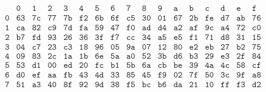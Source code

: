 \begin{table}[H]
\centering
\vspace{-1em}
\[
\begin{array}{c|*{16}{c}}
  & \texttt{0} & \texttt{1} & \texttt{2} & \texttt{3} & \texttt{4} & \texttt{5} & \texttt{6} & \texttt{7} & \texttt{8} & \texttt{9} & \texttt{a} & \texttt{b} & \texttt{c} & \texttt{d} & \texttt{e} & \texttt{f} \\ \hline
\texttt{0} & \texttt{63} & \texttt{7c} & \texttt{77} & \texttt{7b} & \texttt{f2} & \texttt{6b} & \texttt{6f} & \texttt{c5} & \texttt{30} & \texttt{01} & \texttt{67} & \texttt{2b} & \texttt{fe} & \texttt{d7} & \texttt{ab} & \texttt{76} \\
\texttt{1} & \texttt{ca} & \texttt{82} & \texttt{c9} & \texttt{7d} & \texttt{fa} & \texttt{59} & \texttt{47} & \texttt{f0} & \texttt{ad} & \texttt{d4} & \texttt{a2} & \texttt{af} & \texttt{9c} & \texttt{a4} & \texttt{72} & \texttt{c0} \\
\texttt{2} & \texttt{b7} & \texttt{fd} & \texttt{93} & \texttt{26} & \texttt{36} & \texttt{3f} & \texttt{f7} & \texttt{cc} & \texttt{34} & \texttt{a5} & \texttt{e5} & \texttt{f1} & \texttt{71} & \texttt{d8} & \texttt{31} & \texttt{15} \\
\texttt{3} & \texttt{04} & \texttt{c7} & \texttt{23} & \texttt{c3} & \texttt{18} & \texttt{96} & \texttt{05} & \texttt{9a} & \texttt{07} & \texttt{12} & \texttt{80} & \texttt{e2} & \texttt{eb} & \texttt{27} & \texttt{b2} & \texttt{75} \\
\texttt{4} & \texttt{09} & \texttt{83} & \texttt{2c} & \texttt{1a} & \texttt{1b} & \texttt{6e} & \texttt{5a} & \texttt{a0} & \texttt{52} & \texttt{3b} & \texttt{d6} & \texttt{b3} & \texttt{29} & \texttt{e3} & \texttt{2f} & \texttt{84} \\
\texttt{5} & \texttt{53} & \texttt{d1} & \texttt{00} & \texttt{ed} & \texttt{20} & \texttt{fc} & \texttt{b1} & \texttt{5b} & \texttt{6a} & \texttt{cb} & \texttt{be} & \texttt{39} & \texttt{4a} & \texttt{4c} & \texttt{58} & \texttt{cf} \\
\texttt{6} & \texttt{d0} & \texttt{ef} & \texttt{aa} & \texttt{fb} & \texttt{43} & \texttt{4d} & \texttt{33} & \texttt{85} & \texttt{45} & \texttt{f9} & \texttt{02} & \texttt{7f} & \texttt{50} & \texttt{3c} & \texttt{9f} & \texttt{a8} \\
\texttt{7} & \texttt{51} & \texttt{a3} & \texttt{40} & \texttt{8f} & \texttt{92} & \texttt{9d} & \texttt{38} & \texttt{f5} & \texttt{bc} & \texttt{b6} & \texttt{da} & \texttt{21} & \texttt{10} & \texttt{ff} & \texttt{f3} & \texttt{d2} \\

\end{array}\]
\end{table}
